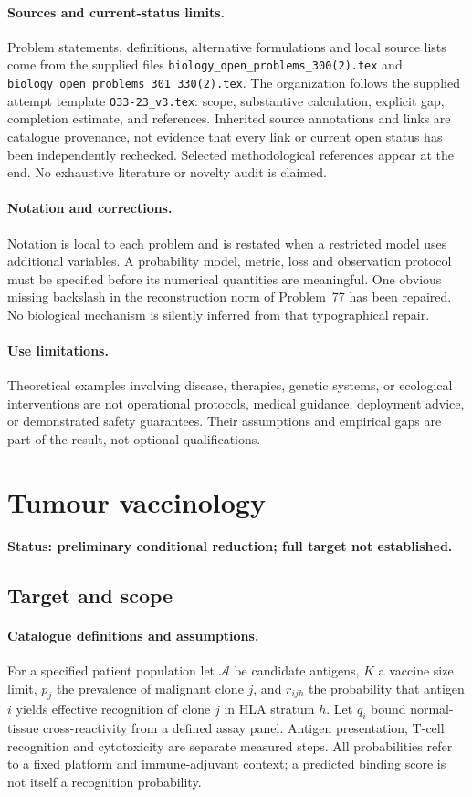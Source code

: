 \documentclass[11pt]{article}
\begin{document}
\paragraph{Sources and current-status limits.}
Problem statements, definitions, alternative formulations and local source lists
come from the supplied files
\texttt{biology\_open\_problems\_300(2).tex} and
\texttt{biology\_open\_problems\_301\_330(2).tex}.
The organization follows the supplied attempt template
\texttt{O33-23\_v3.tex}: scope, substantive calculation, explicit gap,
completion estimate, and references. Inherited source annotations and links are
catalogue provenance, not evidence that every link or current open status has
been independently rechecked. Selected methodological references appear at the
end. No exhaustive literature or novelty audit is claimed.

\paragraph{Notation and corrections.}
Notation is local to each problem and is restated when a restricted model uses
additional variables. A probability model, metric, loss and observation protocol
must be specified before its numerical quantities are meaningful. One obvious
missing backslash in the reconstruction norm of Problem~77 has been repaired.
No biological mechanism is silently inferred from that typographical repair.

\paragraph{Use limitations.}
Theoretical examples involving disease, therapies, genetic systems, or ecological
interventions are not operational protocols, medical guidance, deployment advice,
or demonstrated safety guarantees. Their assumptions and empirical gaps are part
of the result, not optional qualifications.


\section*{Tumour vaccinology}
\label{prob:258}
\noindent\textbf{Status: preliminary conditional reduction; full target not established.}
\subsection{Target and scope}
\paragraph{Catalogue definitions and assumptions.}
For a specified patient population let $\mathcal A$ be candidate antigens, $K$ a vaccine size limit, $p_j$ the prevalence of malignant clone $j$, and $r_{ijh}$ the probability that antigen $i$ yields effective recognition of clone $j$ in HLA stratum $h$. Let $q_i$ bound normal-tissue cross-reactivity from a defined assay panel. Antigen presentation, T-cell recognition and cytotoxicity are separate measured steps. All probabilities refer to a fixed platform and immune-adjuvant context; a predicted binding score is not itself a recognition probability.
\end{document}
